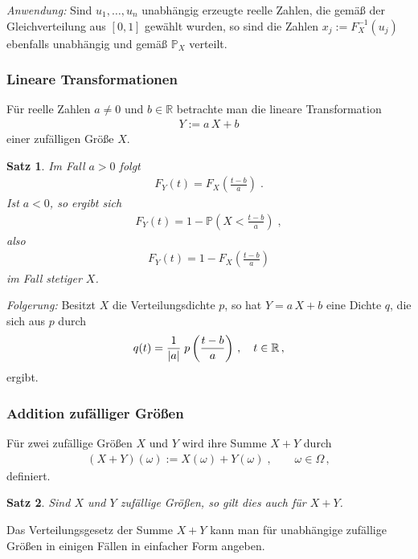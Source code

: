 \documentclass[ngerman,draft,parskip=half,twoside]{scrartcl}
\newtheorem{thm}{Satz}[section]
\DeclarePairedDelimiter{\abs}{\lvert}{\rvert}
\newcommand*{\R}{\mathbb{R}}      %
\newcommand*{\WKM}{\mathbb{P}}      %
\begin{document}
\textit{Anwendung:}
Sind $u_1,\dotsc,u_n$ unabhängig erzeugte reelle Zahlen, die gemäß der
Gleichverteilung aus $[0,1]$ gewählt wurden, so sind die Zahlen $x_j:=
F_X^{-1}(u_j)$ ebenfalls unabhängig und gemäß $\WKM_X$ verteilt.

\subsubsection{Lineare Transformationen}

Für reelle Zahlen $a\ne0$ und $b\in\R$ betrachte man die lineare
Transformation
\begin{gather*}
  Y:=a\,X+ b
\end{gather*}
einer zufälligen Größe $X$.

\begin{thm}
  Im Fall $a>0$ folgt
  \begin{gather*}
    F_Y(t)=F_X\left(\frac{t-b}{a}\right)\;.
  \end{gather*}
  Ist $a<0$, so ergibt sich
  \begin{gather*}
    F_Y(t)=1-\WKM\left(X<\frac{t-b}{a}\right)\;,
  \end{gather*}
  also
  \begin{gather*}
    F_Y(t)=1-F_X\left(\frac{t-b}{a}\right)
  \end{gather*}
  im Fall stetiger $X$.
\end{thm}

\textit{Folgerung:}
Besitzt $X$ die Verteilungsdichte $p$, so hat $Y=a\,X+b$ eine Dichte $q$, die
sich aus $p$ durch
\begin{gather*}
  q(t)=\frac{1}{\abs{a}}\;p\left(\frac{t-b}{a}\right)\,,\quad t\in\R\,,
\end{gather*}
ergibt.

\subsubsection{Addition zufälliger Größen}

Für zwei zufällige Größen $X$  und $Y$ wird ihre Summe $X+Y$ durch
\begin{gather*}
  (X+Y)(\omega):=X(\omega)+Y(\omega)\;,\qquad \omega\in\Omega\,,
\end{gather*}
definiert.

\begin{thm}
  Sind $X$ und $Y$ zufällige Größen, so gilt dies auch für $X+Y$.
\end{thm}
Das Verteilungsgesetz der Summe $X+Y$ kann man für unabhängige zufällige Größen
in einigen Fällen in einfacher Form angeben.
\end{document}
